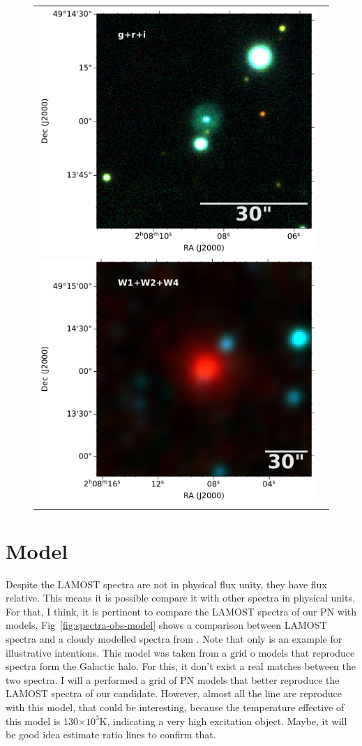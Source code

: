 \documentclass[twocolumn]{article}
\begin{document}
\begin{figure}
  \centering
  \begin{tabular}{l l}
\includegraphics[width=0.5\linewidth]{../image-panstarr/cutout_rings_v3_skycell_2294_031_stk_i_unconv-irg-RGB.pdf}
\includegraphics[width=0.5\linewidth]{../image-wise/w4_ra32_035994_dec49_233615-421-RGB.pdf}
\end{tabular}  
  \caption{} 
  \label{fig:image}
\end{figure}


\section{Model}
\label{sec:model}

Despite the LAMOST spectra are not in physical flux unity, they have flux relative. This means it
is possible compare it with other spectra in physical units. For that, I think, it is pertinent to
compare the LAMOST spectra of our PN with models. Fig~\ref{fig:spectra-obs-model} shows a comparison between LAMOST spectra and a {\sc cloudy} modelled spectra from \citet{Gutierrez-Soto:2020}. Note that only is an example for illustrative intentions. This model was taken from a grid o models that reproduce spectra form the Galactic halo. For this, it don't exist a real matches between the two spectra. I will a performed a grid of PN models that better reproduce the LAMOST spectra of our candidate. However, almost all the line are reproduce with this model, that could be interesting, because the temperature effective of this model is 130$\times10^3$K, indicating a very high excitation object. Maybe, it will be good idea estimate ratio lines to confirm that. 
\end{document}
